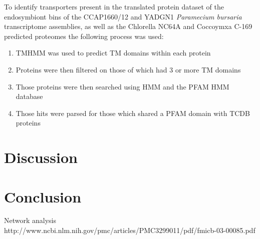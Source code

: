 To identify transporters present in the translated protein dataset of the 
endosymbiont bins of the CCAP1660/12 and YADGN1 
\textit{Paramecium bursaria} transcriptome assemblies, as well as the Chlorella NC64A 
and Coccoymxa C-169 predicted proteomes the following process was used:

\begin{enumerate}
        \item TMHMM was used to predict TM domains within each protein
        \item Proteins were then filtered on those of which had 3 or more TM domains
        \item Those proteins were then searched using HMM and the PFAM HMM database
        \item Those hits were parsed for those which shared a PFAM domain with TCDB proteins
\end{enumerate}

\section{Discussion}

\section{Conclusion}


Network analysis
http://www.ncbi.nlm.nih.gov/pmc/articles/PMC3299011/pdf/fmicb-03-00085.pdf



